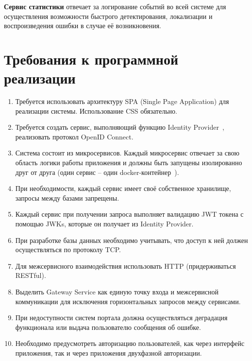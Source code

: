 \textbf{Сервис статистики} отвечает за логирование событий во всей системе для осуществления возможности быстрого детектирования, локализации и воспроизведения ошибки в случае её возникновения.

\section{Требования к программной реализации}
\begin{enumerate}
	\item Требуется использовать архитектуру SPA (Single Page Application) для реализации системы. Использование CSS обязательно.
	
	\item Требуется создать сервис, выполняющий функцию Identity Provider~\cite{idprovider}, реализовать протокол OpenID Connect.
	
	\item  Система состоит из микросервисов. Каждый микросервис отвечает за свою область логики работы приложения и должны быть запущены изолированно друг от друга (один сервис -- один docker-контейнер~\cite{docker}).
	
	\item  При необходимости, каждый сервис имеет своё собственное хранилище, запросы между базами запрещены.
	
	\item  Каждый сервис при получении запроса выполняет валидацию JWT токена с помощью JWKs, которые он получает из Identity Provider.
	
	\item  При разработке базы данных необходимо учитывать, что доступ к ней должен осуществляться по протоколу TCP.
	
	\item  Для межсервисного взаимодействия использовать HTTP (придерживаться RESTful).
	
	\item  Выделить Gateway Service как единую точку входа и межсервисной коммуникации для исключения горизонтальных запросов между сервисами.
	
	\item  При недоступности систем портала должна осуществляться деградация функционала или выдача пользователю сообщения об ошибке.
	
	\item  Необходимо предусмотреть авторизацию пользователей, как через интерфейс приложения, так и через приложения двухфазной авторизации.
	

\end{enumerate}
